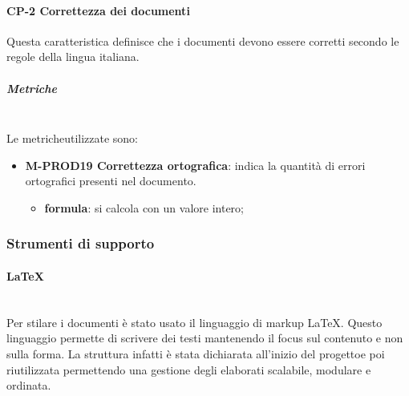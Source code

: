         \paragraph{CP-2 Correttezza dei documenti}
        Questa caratteristica definisce che i documenti devono essere corretti secondo le regole della lingua italiana.
        \subparagraph{Metriche}\mbox{}\\ [1mm]
        Le metriche\glosp utilizzate sono:   
        \begin{itemize}
         	  \item \textbf{M-PROD19 Correttezza ortografica}: indica la quantità di errori ortografici presenti nel documento.
         	  \begin{itemize}
	          	  	\item[] \textbf{formula}: si calcola con un valore intero;
         	  \end{itemize}
	          \end{itemize}
        \subsubsection{Strumenti di supporto}
            \paragraph{\LaTeX}\mbox{}\\ [1mm]
                Per stilare i documenti è stato usato il linguaggio di markup \LaTeX \xspace. Questo linguaggio permette di scrivere dei testi mantenendo il focus
                sul contenuto e non sulla forma. La struttura infatti è stata dichiarata all'inizio del progetto\glosp e poi riutilizzata permettendo una gestione degli elaborati scalabile, modulare e ordinata.
